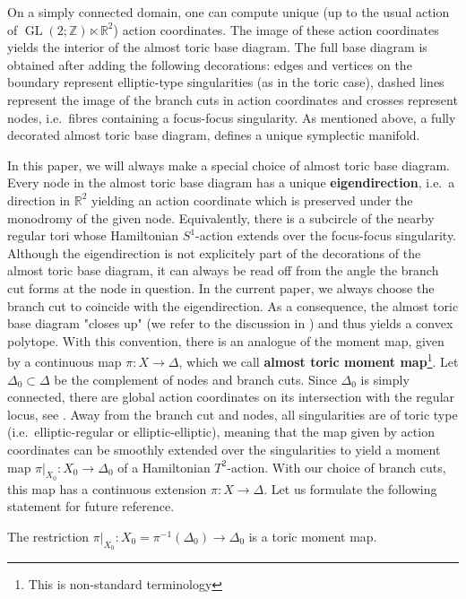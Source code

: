 \documentclass[12pt,a4paper,draft]{scrartcl}
\begin{document}
On a simply connected domain, one can compute unique (up to the usual action of $\operatorname{GL}(2;\mathbb{Z}) \ltimes \mathbb{R}^2$) action coordinates.
The image of these action coordinates yields the interior of the almost toric base diagram.
The full base diagram is obtained after adding the following decorations: edges and vertices on the boundary represent elliptic-type singularities (as in the toric case), dashed lines represent the image of the branch cuts in action coordinates and crosses represent nodes, i.e.\ fibres containing a focus-focus singularity.
As mentioned above, a fully decorated almost toric base diagram, defines a unique symplectic manifold.

In this paper, we will always make a special choice of almost toric base diagram.
Every node in the almost toric base diagram has a unique \textbf{eigendirection}, i.e.\ a direction in $\mathbb{R}^2$ yielding an action coordinate which is preserved under the monodromy of the given node.
Equivalently, there is a subcircle of the nearby regular tori whose Hamiltonian $S^1$-action extends over the focus-focus singularity.
Although the eigendirection is not explicitely part of the decorations of the almost toric base diagram, it can always be read off from the angle the branch cut forms at the node in question.
In the current paper, we always choose the branch cut to coincide with the eigendirection.
As a consequence, the almost toric base diagram "closes up" (we refer to the discussion in \cite[Section 7.2]{evans2021atfs}) and thus yields a convex polytope.
With this convention, there is an analogue of the moment map, given by a continuous map $\pi \colon X \rightarrow \Delta$, which we call \textbf{almost toric moment map}\footnote{This is non-standard terminology}.
Let $\Delta_0 \subset \Delta$ be the complement of nodes and branch cuts.
Since $\Delta_0$ is simply connected, there are global action coordinates on its intersection with the regular locus, see \cite{Dui80}. Away from the branch cut and nodes, all singularities are of toric type (i.e.\ elliptic-regular or elliptic-elliptic), meaning that the map given by action coordinates can be smoothly extended over the singularities to yield a moment map $\pi\vert_{X_0} \colon X_0 \rightarrow \Delta_0$ of a Hamiltonian $T^2$-action.
With our choice of branch cuts, this map has a continuous extension $\pi \colon X \rightarrow \Delta$. Let us formulate the following statement for future reference.

\begin{proposition}
    \label{thm:toricmomentmap}
    The restriction $\pi\vert_{X_0} \colon X_0 = \pi^{-1}(\Delta_0) \rightarrow \Delta_0$ is a toric moment map.
\end{proposition}
\end{document}
